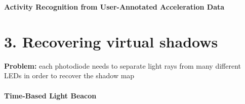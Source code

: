 \documentclass[12pt]{article}
\begin{document}
 

{\Large\centering
    \textbf{Activity Recognition from User-Annotated Acceleration Data}
\par}

\bigskip

\noindent
\section*{3. Recovering virtual shadows}

\textbf{Problem:} each photodiode needs to separate light rays from many different LEDs in order to recover the shadow map

\paragraph{Time-Based Light Beacon}
\end{document}
